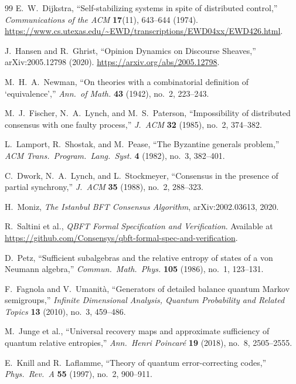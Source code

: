 \documentclass[11pt]{article}
\theoremstyle{remark}
\theoremstyle{plain}
\begin{document}
\begin{thebibliography}{99}
E.~W.~Dijkstra,
``Self-stabilizing systems in spite of distributed control,''
\emph{Communications of the ACM} \textbf{17}(11), 643--644 (1974).
\url{https://www.cs.utexas.edu/~EWD/transcriptions/EWD04xx/EWD426.html}.

J.~Hansen and R.~Ghrist,
``Opinion Dynamics on Discourse Sheaves,'' arXiv:2005.12798 (2020).
\url{https://arxiv.org/abs/2005.12798}.

M.~H.~A.~Newman,
``On theories with a combinatorial definition of `equivalence',''
\emph{Ann.\ of Math.} \textbf{43} (1942), no.~2, 223--243.

M.~J.~Fischer, N.~A.~Lynch, and M.~S.~Paterson,
``Impossibility of distributed consensus with one faulty process,''
\emph{J.\ ACM} \textbf{32} (1985), no.~2, 374--382.

L.~Lamport, R.~Shostak, and M.~Pease,
``The Byzantine generals problem,''
\emph{ACM Trans.\ Program.\ Lang.\ Syst.} \textbf{4} (1982), no.~3, 382--401.

C.~Dwork, N.~A.~Lynch, and L.~Stockmeyer,
``Consensus in the presence of partial synchrony,''
\emph{J.\ ACM} \textbf{35} (1988), no.~2, 288--323.

H.~Moniz,
\emph{The Istanbul BFT Consensus Algorithm},
arXiv:2002.03613, 2020.

R.~Saltini et al.,
\emph{QBFT Formal Specification and Verification}.
Available at \url{https://github.com/Consensys/qbft-formal-spec-and-verification}.

D.~Petz,
``Sufficient subalgebras and the relative entropy of states of a von Neumann algebra,''
\emph{Commun.\ Math.\ Phys.} \textbf{105} (1986), no.~1, 123--131.

F.~Fagnola and V.~Umanit\`a,
``Generators of detailed balance quantum Markov semigroups,''
\emph{Infinite Dimensional Analysis, Quantum Probability and Related Topics}
\textbf{13} (2010), no.~3, 459--486.

M.~Junge et al.,
``Universal recovery maps and approximate sufficiency of quantum relative entropies,''
\emph{Ann.\ Henri Poincar\'e} \textbf{19} (2018), no.~8, 2505--2555.

E.~Knill and R.~Laflamme,
``Theory of quantum error-correcting codes,''
\emph{Phys.\ Rev.\ A} \textbf{55} (1997), no.~2, 900--911.


\end{thebibliography}
\end{document}
